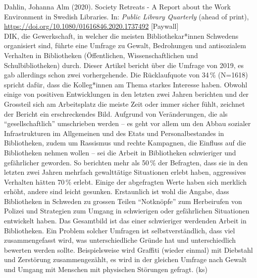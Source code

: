 \documentclass[a4paper,
fontsize=11pt,
oneside,
numbers=noperiodatend,
parskip=half-,
bibliography=totoc,
final
]{scrartcl}
\begin{document}
Dahlin, Johanna Alm (2020). Society Retreats - A Report about the Work
Environment in Swedish Libraries. In: \emph{Public Library Quarterly}
(ahead of print), \url{https://doi.org/10.1080/01616846.2020.1737492}
{[}Paywall{]}\\
DIK, die Gewerkschaft, in welcher die meisten Bibliothekar*innen
Schwedens organisiert sind, führte eine Umfrage zu Gewalt, Bedrohungen
und antisozialem Verhalten in Bibliotheken (Öffentlichen,
Wissenschaftlichen und Schulbibliotheken) durch. Dieser Artikel bericht
über die Umfrage von 2019, es gab allerdings schon zwei vorhergehende.
Die Rücklaufquote von 34\,\% (N=1618) spricht dafür, dass die
Kolleg*innen am Thema starkes Interesse haben. Obwohl einige von
positiven Entwicklungen in den letzten zwei Jahren berichten und der
Grossteil sich am Arbeitsplatz die meiste Zeit oder immer sicher fühlt,
zeichnet der Bericht ein erschreckendes Bild. Aufgrund von
Veränderungen, die als ``gesellschaftlich'' umschrieben werden -- es
geht vor allem um den Abbau sozialer Infrastrukturen im Allgemeinen und
des Etats und Personalbestandes in Bibliotheken, zudem um Rassismus und
rechte Kampagnen, die Einfluss auf die Bibliotheken nehmen wollen -- sei
die Arbeit in Bibliotheken schwieriger und gefährlicher geworden. So
berichten mehr als 50\,\% der Befragten, dass sie in den letzten zwei
Jahren mehrfach gewalttätige Situationen erlebt haben, aggressives
Verhalten hätten 70\,\% erlebt. Einige der abgefragten Werte haben sich
merklich erhöht, andere sind leicht gesunken. Erstaunlich ist wohl die
Angabe, dass Bibliotheken in Schweden zu grossen Teilen ``Notknöpfe''
zum Herbeirufen von Polizei und Strategien zum Umgang in schwierigen
oder gefährlichen Situationen entwickelt haben. Das Gesamtbild ist das
einer schwieriger werdenden Arbeit in Bibliotheken. Ein Problem solcher
Umfragen ist selbstverständlich, dass viel zusammengefasst wird, was
unterschiedliche Gründe hat und unterschiedlich bewerten werden sollte.
Beispielsweise wird Graffiti (wieder einmal) mit Diebstahl und
Zerstörung zusammengezählt, es wird in der gleichen Umfrage nach Gewalt
und Umgang mit Menschen mit physischen Störungen gefragt. (ks)
\end{document}
